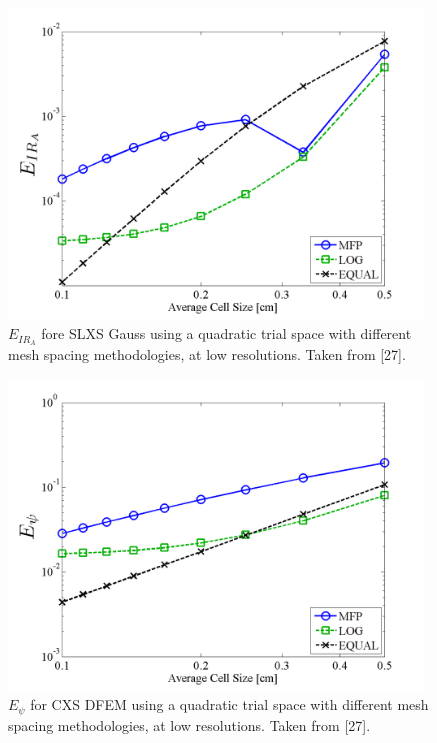 \begin{figure}[!htp]
\centering
\includegraphics[width=11cm]{chapter3_variable_xs/LOW_RES_P2_GAUSS_E_IR_A.png}
\caption{$E_{IR_A}$ fore SLXS Gauss using a quadratic trial space with different mesh spacing methodologies, at low resolutions.  Taken from [27].}
\label{fig:low_res_gauss_ir_A}
\end{figure}
%
%
\begin{figure}[!hbp]
\centering
\includegraphics[width=11cm]{chapter3_variable_xs/LOW_RES_P2_CXS_E_PSI.png}
\caption{$E_{\psi}$ for CXS DFEM using a quadratic trial space  with different mesh spacing methodologies, at low resolutions.  Taken from [27].}
\label{fig:low_res_cxs_psi}
\end{figure}
%
